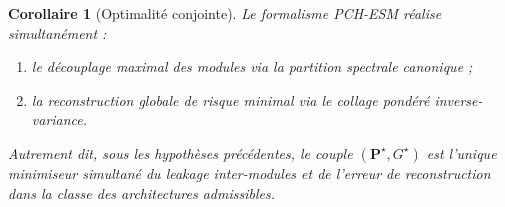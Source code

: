 \documentclass[11pt,a4paper]{article}
\newtheorem{corollary}{Corollaire}[section]
\newcommand{\1}{\mathbf 1}
\begin{document}
\begin{corollary}[Optimalité conjointe]
Le formalisme PCH-ESM réalise simultanément :
\begin{enumerate}[leftmargin=2em]
    \item le découplage maximal des modules via la partition spectrale canonique ;
    \item la reconstruction globale de risque minimal via le collage pondéré inverse-variance.
\end{enumerate}
Autrement dit, sous les hypothèses précédentes, le couple \((\mathbf P^\star,G^\star)\) est l'unique minimiseur simultané du leakage inter-modules et de l'erreur de reconstruction dans la classe des architectures admissibles.
\end{corollary}
\end{document}
